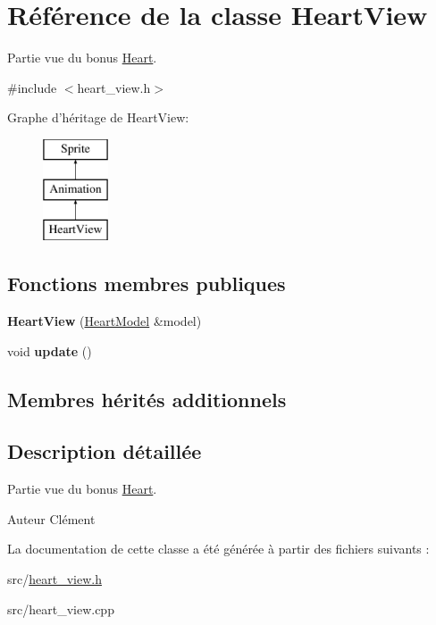 \hypertarget{class_heart_view}{\section{Référence de la classe Heart\+View}
\label{class_heart_view}
}


Partie vue du bonus \hyperlink{class_heart}{Heart}.  




{\ttfamily \#include $<$heart\+\_\+view.\+h$>$}

Graphe d'héritage de Heart\+View\+:\begin{figure}[H]
\begin{center}
\leavevmode
\includegraphics[height=3.000000cm]{class_heart_view}
\end{center}
\end{figure}
\subsection*{Fonctions membres publiques}
\begin{DoxyCompactItemize}
\item 
\hypertarget{class_heart_view_aa776188eee2ce69a9618e4e1008f0d9e}{{\bfseries Heart\+View} (\hyperlink{class_heart_model}{Heart\+Model} \&model)}\label{class_heart_view_aa776188eee2ce69a9618e4e1008f0d9e}

\item 
\hypertarget{class_heart_view_a55893640b21e2b58e96feffcdfaeb6bd}{void {\bfseries update} ()}\label{class_heart_view_a55893640b21e2b58e96feffcdfaeb6bd}

\end{DoxyCompactItemize}
\subsection*{Membres hérités additionnels}


\subsection{Description détaillée}
Partie vue du bonus \hyperlink{class_heart}{Heart}. 

\begin{DoxyAuthor}{Auteur}
Clément 
\end{DoxyAuthor}


La documentation de cette classe a été générée à partir des fichiers suivants \+:\begin{DoxyCompactItemize}
\item 
src/\hyperlink{heart__view_8h}{heart\+\_\+view.\+h}\item 
src/heart\+\_\+view.\+cpp\end{DoxyCompactItemize}

